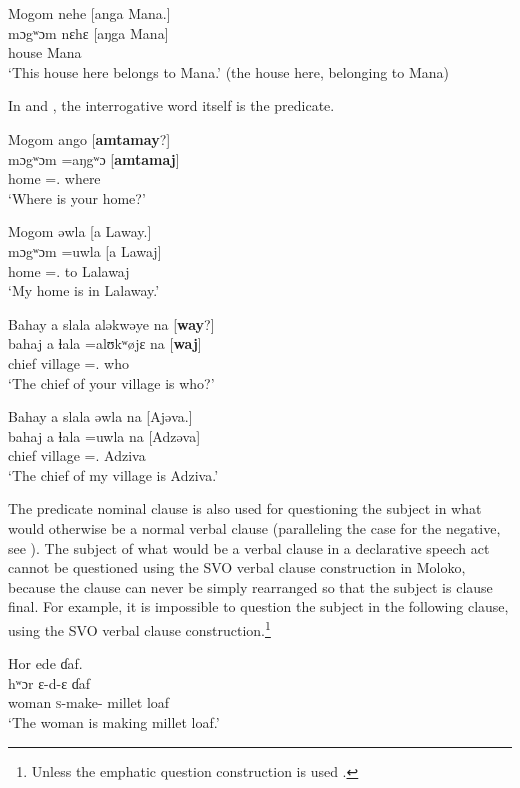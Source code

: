 \ea \label{ex:10:67}
Mogom  nehe  [anga  Mana.]\\
\gll  mɔgʷɔm  nɛhɛ  [aŋga  Mana]\\
      house  {\DEM}  {\POSS}  Mana\\
\glt  ‘This house here belongs to Mana.’ (the house here, belonging to Mana)
\z

In  and , the interrogative word itself is the predicate. 

\ea \label{ex:10:68}
Mogom  ango  [\textbf{amtamay}?]\\
\gll  mɔgʷɔm  =aŋgʷɔ     [\textbf{amtamaj}]\\
      home  ={\twoS}.{\POSS}  where\\
\glt  ‘Where is your home?’
\z

\clearpage
\ea \label{ex:10:69}
Mogom  əwla  [a Laway.]\\
\gll  mɔgʷɔm  =uwla     [a Lawaj]\\
      home  ={\oneS}.{\POSS}  to  Lalawaj\\
\glt  ‘My home is in Lalaway.’
\z

\ea \label{ex:10:70}
 Bahay  a  slala  aləkwəye na  [\textbf{way}?]\\
\gll  bahaj  a  ɬala  =alʊkʷøjɛ  na  [\textbf{waj}]\\
      chief  {\GEN}  village  ={\twoP}.{\POSS}  {\PSP}  who\\
\glt  ‘The chief of your village is who?’
\z

\ea \label{ex:10:71}
Bahay  a  slala  əwla  na  [Ajəva.]\\
\gll  bahaj  a  ɬala  =uwla    na  [Adzəva]\\
      chief  {\GEN}  village  ={\oneS}.{\POSS}  {\PSP}  Adziva\\
\glt  ‘The chief of my village is Adziva.’
\z

The predicate nominal clause is also used for questioning the subject in what would otherwise be a normal verbal clause (paralleling the case for the negative, see ). The subject of what would be a verbal clause in a declarative speech act cannot be questioned using the SVO verbal clause construction in Moloko, because the clause can never be simply rearranged so that the subject is clause final. For example, it is impossible to question the subject in the following clause, using the SVO verbal clause construction.\footnote{Unless the emphatic question construction is used .} 

\ea \label{ex:10:72}
Hor  ede  ɗaf.\\
\gll  hʷɔr  ɛ-d-ɛ    ɗaf\\
      woman  \textsc{s}-make-{\CL}  {millet loaf}\\
\glt  ‘The woman is making millet loaf.’
\z

